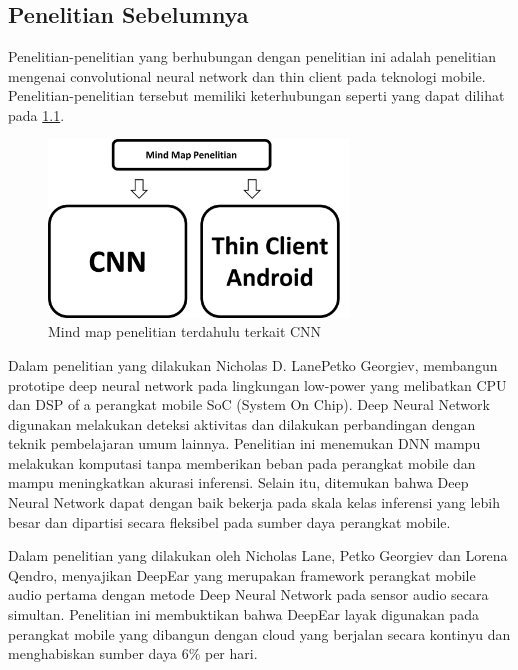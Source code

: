 \chapter{\babDua}
\section{Penelitian Sebelumnya}
Penelitian-penelitian yang berhubungan dengan penelitian ini adalah penelitian mengenai convolutional neural network dan thin client pada teknologi mobile. Penelitian-penelitian tersebut memiliki keterhubungan seperti yang dapat dilihat pada \ref{fig:mind_map}.\\
\begin{figure}[htp]
	\centering
	\includegraphics[width=8cm]{pics/mind_map_final}
	\caption{Mind map penelitian terdahulu terkait CNN}
	\label{fig:mind_map}
\end{figure}

Dalam penelitian \cite{can_deep_learning} yang dilakukan Nicholas D. LanePetko Georgiev, membangun prototipe deep neural network pada lingkungan low-power yang melibatkan CPU dan DSP of a perangkat mobile SoC (System On Chip). Deep Neural Network digunakan melakukan deteksi aktivitas dan dilakukan perbandingan dengan teknik pembelajaran umum lainnya. Penelitian ini menemukan DNN mampu melakukan komputasi tanpa memberikan beban pada perangkat mobile dan mampu meningkatkan akurasi inferensi. Selain itu, ditemukan bahwa Deep Neural Network dapat dengan baik bekerja pada skala kelas inferensi yang lebih besar dan dipartisi secara fleksibel pada sumber daya perangkat mobile.

Dalam penelitian \cite{deepear} yang dilakukan oleh Nicholas Lane, Petko Georgiev dan Lorena Qendro, menyajikan DeepEar yang merupakan framework perangkat mobile audio pertama dengan metode Deep Neural Network pada sensor audio secara simultan. Penelitian ini membuktikan bahwa DeepEar layak digunakan pada perangkat mobile yang dibangun dengan cloud yang berjalan secara kontinyu dan menghabiskan sumber daya 6\% per hari.

